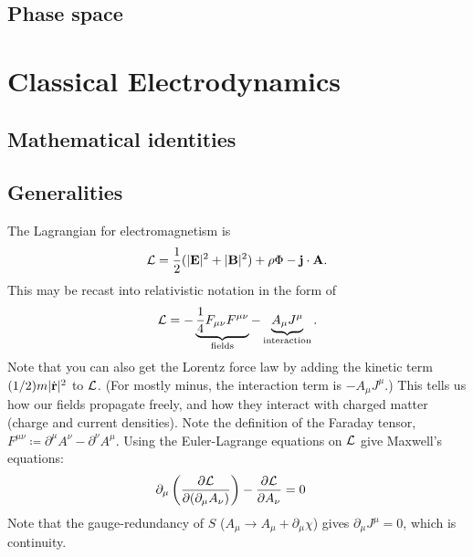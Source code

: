 \documentclass[11pt]{article}
\begin{document}
\subsection{Phase space}


\newpage

\section{Classical Electrodynamics}

\subsection{Mathematical identities}


\subsection{Generalities}

The Lagrangian for electromagnetism is
\begin{align*}
    \mathcal{L} = \frac{1}{2} (|\mathbf{E}|^2 + |\mathbf{B}|^2) + \rho \Phi - \mathbf{j} \cdot \mathbf{A}.
\end{align*}
This may be recast into relativistic notation in the form of
\begin{align*}
    \mathcal{L} = - \underbrace{\frac{1}{4} F_{\mu \nu} F^{\mu \nu}}_{\rm fields} - \underbrace{A_{\mu} J^{\mu}}_{\rm interaction}.
\end{align*}
Note that you can also get the Lorentz force law by adding
the kinetic term $(1/2)m|\dot{\mathbf{r}}|^2$ to $\mathcal{L}$.
(For mostly minus, the interaction term is $- A_{\mu} J^\mu$.)
This tells us how our fields propagate freely, and how they interact
with charged matter (charge and current densities). Note the definition
of the Faraday tensor, $F^{\mu \nu} \coloneqq \partial^\mu A^\nu - \partial^\nu A^\mu$.
Using the Euler-Lagrange equations on $\mathcal{L}$ give Maxwell's equations:
\begin{align*}
    \partial_\mu \left( \frac{\partial \mathcal{L}}{\partial (\partial_\mu A_\nu)} \right) - \frac{\partial \mathcal{L}}{\partial A_\nu} & = 0
\end{align*}
Note that the gauge-redundancy of $S$ ($A_\mu \to A_\mu + \partial_\mu \chi$)
gives $\partial_\mu J^\mu = 0$, which is continuity.
\end{document}

